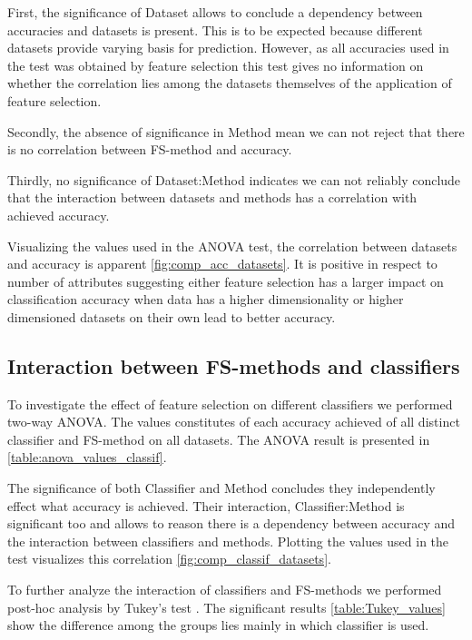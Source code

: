 

First, the significance of Dataset allows to conclude a dependency between accuracies and datasets is present. This is to be expected because different datasets provide varying basis for prediction. However, as all accuracies used in the test was obtained by feature selection this test gives no information on whether the correlation lies among the datasets themselves of the application of feature selection.

Secondly, the absence of significance in Method mean we can not reject that there is no correlation between FS-method and accuracy.

Thirdly, no significance of Dataset:Method indicates we can not reliably conclude that the interaction between datasets and methods has a correlation with achieved accuracy.

Visualizing the values used in the ANOVA test, the correlation between datasets and accuracy is apparent \ref{fig:comp_acc_datasets}. It is positive in respect to number of attributes suggesting either feature selection has a larger impact on classification accuracy when data has a higher dimensionality or higher dimensioned datasets on their own lead to better accuracy.



\subsection{Interaction between FS-methods and classifiers}
\label{sec:fs_methods_classifiers}

To investigate the effect of feature selection on different classifiers we performed two-way ANOVA. The values constitutes of each accuracy achieved of all distinct classifier and FS-method on all datasets. The ANOVA result is presented in \ref{table:anova_values_classif}.



The significance of both Classifier and Method concludes they independently effect what accuracy is achieved. Their interaction, Classifier:Method is significant too and allows to reason there is a dependency between accuracy and the interaction between classifiers and methods. Plotting the values used in the test visualizes this correlation \ref{fig:comp_classif_datasets}.

To further analyze the interaction of classifiers and FS-methods we performed post-hoc analysis by Tukey's test \parencite{Haynes2013}. The significant results \ref{table:Tukey_values} show the difference among the groups lies mainly in which classifier is used.


